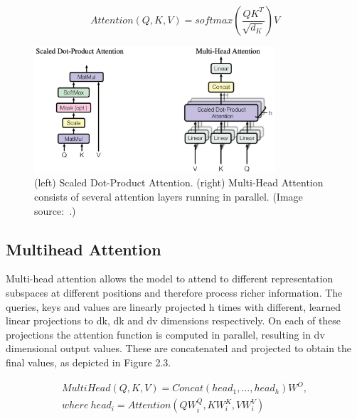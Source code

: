 \begin{equation}
	Attention(Q,K,V)=softmax(\frac{QK^T}{\sqrt{d_K}})V
	\label{equ:self_attention}
\end{equation}


\begin{figure}[!htbp]
	\centering
	\includegraphics[width = 0.8\textwidth]{figures/attention.png}
	\caption[Scaled Dot-Product Attention and Multi-Head Attention]
	{ (left) Scaled Dot-Product Attention. (right) Multi-Head Attention consists of several attention layers running in parallel. (Image source:~\cite{vaswani2017attention}.)}
	\label{fig:attention}
\end{figure}

\subsection{Multihead Attention}

Multi-head attention allows the model to attend to different representation subspaces at different positions and therefore process richer information. The queries, keys and values are linearly projected h times with different, learned linear projections to dk, dk and dv dimensions respectively. On each of these projections the attention function is computed in parallel, resulting in dv dimensional output values. These are concatenated and projected to obtain the final values, as depicted in Figure 2.3.

\begin{equation}
	\begin{aligned}
MultiHead(Q,K,V) = Concat(head_1,...,head_h)W^O, \\
where \ head_i = Attention(QW_i^Q,KW_i^K,VW_i^V)
\end{aligned}
\end{equation}

